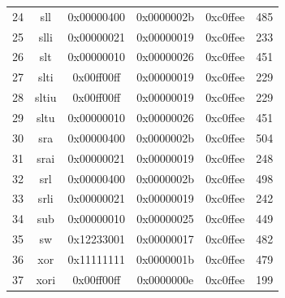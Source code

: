 \documentclass[12pt, a4paper]{ctexart}
\begin{document}
\begin{table}[H]
\begin{tabular}{cccccc}
        24 & sll & 0x00000400 & 0x0000002b & 0xc0ffee & 485 \\
        25 & slli & 0x00000021 & 0x00000019 & 0xc0ffee & 233 \\
        26 & slt & 0x00000010 & 0x00000026 & 0xc0ffee & 451 \\
        27 & slti & 0x00ff00ff & 0x00000019 & 0xc0ffee & 229 \\
        28 & sltiu & 0x00ff00ff & 0x00000019 & 0xc0ffee & 229 \\
        29 & sltu & 0x00000010 & 0x00000026 & 0xc0ffee & 451 \\
        30 & sra & 0x00000400 & 0x0000002b & 0xc0ffee & 504 \\
        31 & srai & 0x00000021 & 0x00000019 & 0xc0ffee & 248 \\
        32 & srl & 0x00000400 & 0x0000002b & 0xc0ffee & 498 \\
        33 & srli & 0x00000021 & 0x00000019 & 0xc0ffee & 242 \\
        34 & sub & 0x00000010 & 0x00000025 & 0xc0ffee & 449 \\
        35 & sw & 0x12233001 & 0x00000017 & 0xc0ffee & 482 \\
        36 & xor & 0x11111111 & 0x0000001b & 0xc0ffee & 479 \\
        37 & xori & 0x00ff00ff & 0x0000000e & 0xc0ffee & 199 \\
        \hline
    \end{tabular}
\end{table}
\end{document}

